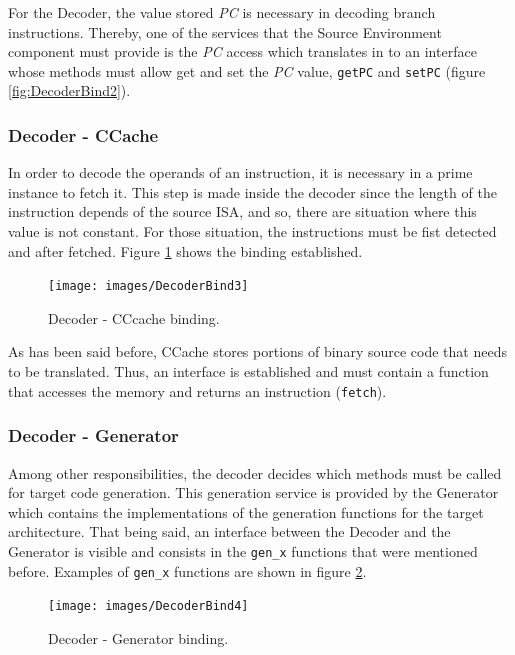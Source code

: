     For the Decoder, the value stored \textit{PC} is necessary in decoding branch instructions. Thereby, one of the services that the Source Environment component must provide is the \textit{PC} access which translates in to an interface whose methods must allow get and set the \textit{PC} value, \texttt{getPC} and \texttt{setPC} (figure \ref{fig:DecoderBind2}). 
     
    \subsubsection*{Decoder - CCache}
    In order to decode the operands of an instruction, it is necessary in a prime instance to fetch it. This step is made inside the decoder since the length of the instruction depends of the source ISA, and so, there are situation where this value is not constant. For those situation, the instructions must be fist detected and after fetched. Figure \ref{fig:DecoderBind3} shows the binding established.
    
    \begin{figure}[!htb]
    \centerline{
    \texttt{[image: images/DecoderBind3]}
    }
    \caption{Decoder - CCcache binding.}
    \label{fig:DecoderBind3} 
    \end{figure}
    
    As has been said before, CCache stores portions of binary source code that needs to be translated. Thus, an interface is established and must contain a function that accesses the memory and returns an instruction (\texttt{fetch}). 
       
    \subsubsection*{Decoder - Generator}
    
    Among other responsibilities, the decoder decides which methods must be called for target code generation. This generation service is provided by the Generator which contains the implementations of the generation functions for the target architecture.
	That being said, an interface between the Decoder and the Generator is visible and consists in the \texttt{gen\_x} functions that were mentioned before. Examples of \texttt{gen\_x} functions are shown in figure \ref{fig:DecoderBind4}.
    
    \begin{figure}[!htb]
    \centerline{
    \texttt{[image: images/DecoderBind4]}
    }
    \caption{Decoder - Generator binding.}
    \label{fig:DecoderBind4} 
    \end{figure}
    

